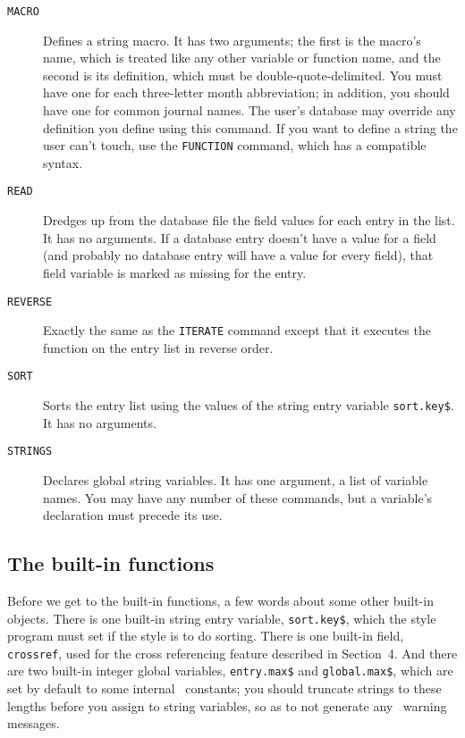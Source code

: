 \begin{description}
\item[\hbox{\tt MACRO}\hfill]
Defines a string macro.
It has two arguments; the first is the macro's name, which is treated like
any other variable or function name,
and the second is its definition, which must be double-quote-delimited.
You must have one for each three-letter month abbreviation;
in addition, you should have one for common journal names.
The user's database may override any definition you define using this command.
If you want to define a string the user can't touch,
use the \hbox{\tt FUNCTION} command, which has a compatible syntax.

\item[\hbox{\tt READ}\hfill]
Dredges up from the database file
the field values for each entry in the list.
It has no arguments.
If a database entry doesn't have a value for a field
(and probably no database entry will have a value for every field),
that field variable is marked as missing for the entry.

\item[\hbox{\tt REVERSE}\hfill]
Exactly the same as the
\hbox{\tt ITERATE} command except that it executes the function
on the entry list in reverse order.

\item[\hbox{\tt SORT}\hfill]
Sorts the entry list using
the values of the string entry variable \hbox{\tt sort.key\$}.
It has no arguments.

\item[\hbox{\tt STRINGS}\hfill]
Declares global string variables.
It has one argument, a list of variable names.
You may have any number of these commands, but a variable's declaration
must precede its use.
\end{description}


\subsection{The built-in functions}
\label{built-in-fns}

Before we get to the built-in functions,
a few words about some other built-in objects.
There is one built-in string entry variable, \hbox{\tt sort.key\$},
which the style program must set if the style is to do sorting.
There is one built-in field, \hbox{\tt crossref},
used for the cross referencing feature
described in Section~4.
And there are two built-in integer global variables,
\hbox{\tt entry.max\$} and \hbox{\tt global.max\$},
which are set by default to some internal \BibTeX\ constants;
you should truncate strings to these lengths before
you assign to string variables,
so as to not generate any \BibTeX\ warning messages.

